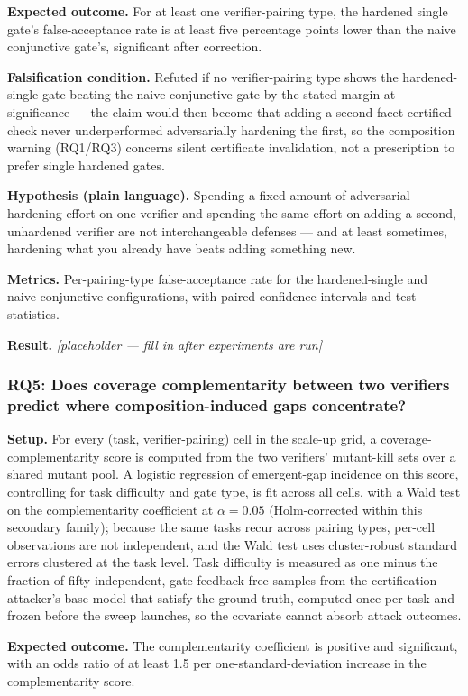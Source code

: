 \documentclass[11pt]{article}
\newcommand{\ph}{\textit{[placeholder --- fill in after experiments are run]}}
\begin{document}
\textbf{Expected outcome.} For at least one verifier-pairing type, the hardened single gate's false-acceptance rate is at least five percentage points lower than the naive conjunctive gate's, significant after correction.

\textbf{Falsification condition.} Refuted if no verifier-pairing type shows the hardened-single gate beating the naive conjunctive gate by the stated margin at significance --- the claim would then become that adding a second facet-certified check never underperformed adversarially hardening the first, so the composition warning (RQ1/RQ3) concerns silent certificate invalidation, not a prescription to prefer single hardened gates.

\textbf{Hypothesis (plain language).} Spending a fixed amount of adversarial-hardening effort on one verifier and spending the same effort on adding a second, unhardened verifier are not interchangeable defenses --- and at least sometimes, hardening what you already have beats adding something new.

\textbf{Metrics.} Per-pairing-type false-acceptance rate for the hardened-single and naive-conjunctive configurations, with paired confidence intervals and test statistics.

\textbf{Result.} \ph

\subsubsection{RQ5: Does coverage complementarity between two verifiers predict where composition-induced gaps concentrate?}
\textbf{Setup.} For every (task, verifier-pairing) cell in the scale-up grid, a coverage-complementarity score is computed from the two verifiers' mutant-kill sets over a shared mutant pool. A logistic regression of emergent-gap incidence on this score, controlling for task difficulty and gate type, is fit across all cells, with a Wald test on the complementarity coefficient at $\alpha = 0.05$ (Holm-corrected within this secondary family); because the same tasks recur across pairing types, per-cell observations are not independent, and the Wald test uses cluster-robust standard errors clustered at the task level. Task difficulty is measured as one minus the fraction of fifty independent, gate-feedback-free samples from the certification attacker's base model that satisfy the ground truth, computed once per task and frozen before the sweep launches, so the covariate cannot absorb attack outcomes.

\textbf{Expected outcome.} The complementarity coefficient is positive and significant, with an odds ratio of at least 1.5 per one-standard-deviation increase in the complementarity score.
\end{document}
